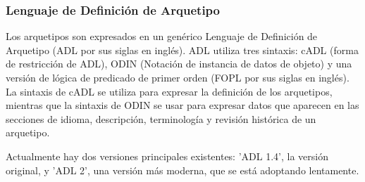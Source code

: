 \subsubsection{Lenguaje de Definición de Arquetipo}

Los arquetipos son expresados en un genérico Lenguaje de Definición de Arquetipo \cite{openEHRADL} (ADL por sus siglas en inglés). ADL utiliza tres sintaxis: cADL (forma de restricción de ADL), ODIN (Notación de instancia de datos de objeto) y una versión de lógica de predicado de primer orden (FOPL por sus siglas en inglés). La sintaxis de cADL se utiliza para expresar la definición de los arquetipos, mientras que la sintaxis de ODIN se usar para expresar datos que aparecen en las secciones de idioma, descripción, terminología y revisión histórica de un arquetipo.

Actualmente hay dos versiones principales existentes: 'ADL 1.4', la versión original, y 'ADL 2', una versión más moderna, que se está adoptando lentamente.
